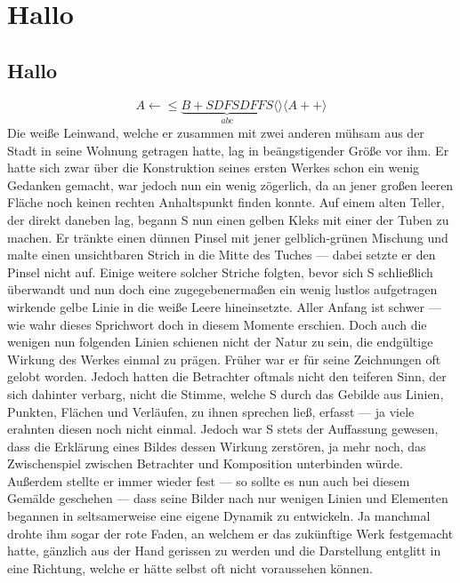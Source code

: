 \documentclass{article}
\begin{document}
\chapter{Hallo}\par
\section{Hallo}


$$ A \leftarrow \leq \underbrace{B + SDFSDFFS}_{abc}
\langle
\rangle \langle A++ \rangle$$
%
Die weiße Leinwand, welche er zusammen mit zwei anderen mühsam aus der Stadt in seine Wohnung getragen hatte, lag in beängstigender Größe vor ihm. Er hatte sich zwar über die Konstruktion seines ersten Werkes schon ein wenig Gedanken gemacht, war jedoch nun ein wenig zögerlich, da an jener großen leeren Fläche noch keinen rechten Anhaltspunkt finden konnte. Auf einem alten Teller, der direkt daneben lag, begann S nun einen gelben Kleks mit einer der Tuben zu machen. Er tränkte einen dünnen Pinsel mit jener gelblich-grünen Mischung und malte einen unsichtbaren Strich in die Mitte des Tuches --- dabei setzte er den Pinsel nicht auf. Einige weitere solcher Striche folgten, bevor sich S schließlich überwandt und nun doch eine zugegebenermaßen ein wenig lustlos aufgetragen wirkende gelbe Linie in die weiße Leere hineinsetzte. Aller Anfang ist schwer --- wie wahr dieses Sprichwort doch in diesem Momente erschien. Doch auch die wenigen nun folgenden Linien schienen nicht der Natur zu sein, die endgültige Wirkung des Werkes einmal zu prägen.
Früher war er für seine Zeichnungen oft gelobt worden. Jedoch hatten die Betrachter oftmals nicht den teiferen Sinn, der sich dahinter verbarg, nicht die Stimme, welche S durch das Gebilde aus Linien, Punkten, Flächen und Verläufen, zu ihnen sprechen ließ, erfasst --- ja viele erahnten diesen noch nicht einmal.
Jedoch war S stets der Auffassung gewesen, dass die Erklärung eines Bildes dessen Wirkung zerstören, ja mehr noch, das Zwischenspiel zwischen Betrachter und Komposition unterbinden würde. Außerdem stellte er immer wieder fest --- so sollte es nun auch bei diesem Gemälde geschehen --- dass seine Bilder nach nur wenigen Linien und Elementen begannen in seltsamerweise eine eigene Dynamik zu entwickeln. Ja manchmal drohte ihm sogar der rote Faden, an welchem er das zukünftige Werk festgemacht hatte, gänzlich aus der Hand gerissen zu werden und die Darstellung entglitt in eine Richtung, welche er hätte selbst oft nicht voraussehen können.
\end{document}
